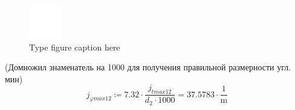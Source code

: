 \documentclass{article}
\newcommand{\defeq}{\coloneq} %
\begin{document}
\begin{figure}[h!]
 \begin{center}
  \includegraphics[max width=\textwidth]{calculations/878.png}
  \caption{Type figure caption here}
  \label{fig:878}
 \end{center}
\end{figure}
\colorbox[HTML]{000000}{(Домножил знаменатель на 1000 для получения правильной размерности угл. мин)}\newline
\begin{equation*}
\textit{j}_{\textit{φmax12}} \defeq 7.32 \cdot \frac{\textit{j}_{\textit{tmax12}}}{\textit{d}_{\textit{2}} \cdot 1000} = {37.5783 \cdot \frac{1}{\mathrm{m}}}
\end{equation*}
\end{document}
